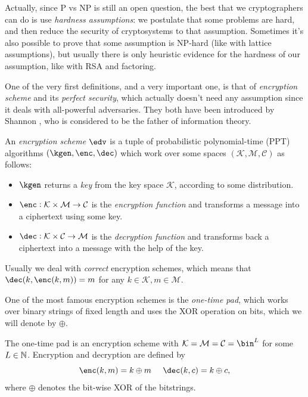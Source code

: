 Actually, since P vs NP is still an open question, the best that we cryptographers can do is use \emph{hardness assumptions}: we postulate that some problems are hard, and then reduce the security of cryptosystems to that assumption. Sometimes it's also possible to prove that some assumption is NP-hard (like with lattice assumptions), but usually there is only heuristic evidence for the hardness of our assumption, like with RSA and factoring.

One of the very first definitions, and a very important one, is that of \emph{encryption scheme} and its \emph{perfect security}, which actually doesn't need any assumption since it deals with all-powerful adversaries. They both have been introduced by Shannon \cite{Shannon}, who is considered to be the father of information theory.

\begin{definition}
    An \emph{encryption scheme} $\edv$ is a tuple of probabilistic polynomial-time (PPT) algorithms $(\kgen,\enc,\dec)$ which work over some spaces $(\mathcal K, \mathcal M, \mathcal C)$ as follows:
    \begin{itemize}
        \item $\kgen$ returns a \emph{key} from the key space $\mathcal K$, according to some distribution.
        \item $\enc:\mathcal K\times\mathcal M\to \mathcal C$ is the \emph{encryption function} and transforms a message into a ciphertext using some key.
        \item $\dec: \mathcal K\times\mathcal C\to \mathcal M$ is the \emph{decryption function} and transforms back a ciphertext into a message with the help of the key.
    \end{itemize}
    Usually we deal with \emph{correct} encryption schemes, which means that $\dec(k,\enc(k,m))=m$ for any $k\in\mathcal K,m\in\mathcal M$.
\end{definition}

One of the most famous encryption schemes is the \emph{one-time pad}, which works over binary strings of fixed length and uses the XOR operation on bits, which we will denote by $\oplus$.

\begin{definition}
    The one-time pad is an encryption scheme with $\mathcal K=\mathcal M=\mathcal C=\bin^L$ for some $L\in\mathbb{N}$. Encryption and decryption are defined by
    $$ \enc(k,m)=k\oplus m\;\;\;\;\; \dec(k,c)=k\oplus c,$$
    where $\oplus$ denotes the bit-wise XOR of the bitstrings.
\end{definition}

